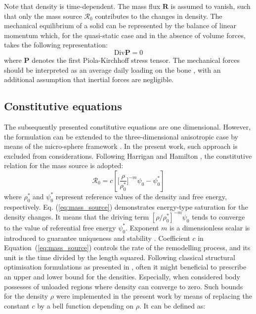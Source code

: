 \documentclass[11pt]{ACMEarticle}
\numberwithin{equation}{section}
\begin{document}
Note that density is time-dependent. The mass flux $\mathbf{R}$ is assumed to vanish, such that only the mass source $\mathcal{R}_0$ contributes to the changes in density. 
The mechanical equilibrium of a solid can be represented by the balance of linear momentum which, for the quasi-static case and in the absence of volume forces, takes the following representation:
\begin{equation}
\text{Div}\mathbf{{\mathbf{P}}} = 0
\label{eq:momentum_balance}
\end{equation}
where $\mathbf{P}$ denotes the first Piola-Kirchhoff stress tensor. 
The mechanical forces should be interpreted as an average daily loading on the bone \citep{kuhl2003computational}, with an additional assumption that inertial forces are negligible. 
\subsection{Constitutive equations}
The subsequently presented constitutive equations are one dimensional. However, the formulation can be extended to the three-dimensional anisotropic case by means of the micro-sphere framework \citep{Waffenschmidt2012}. In the present work, such approach is excluded from considerations.
Following Harrigan and Hamilton \citep{Harrigan1993}, the constitutive relation for the mass source is adopted:
\begin{equation}
\mathcal{R}_{0}=c\left[\Biggl[\frac{\rho}{\rho_{0}^{\ast}}\Biggr]^{-m}\psi_{0}-\psi_{0}^{\ast}\right]
\label{eq:mass_source}
\end{equation}
where $\rho_0^\ast$ and $\psi_{0}^\ast$ represent reference values of the density and free energy, respectively.  Eq. (\ref{eq:mass_source}) demonstrates energy-type saturation for the density changes. It means that the driving term $\left[ \rho / \rho_0^\ast \right]^{-m}\psi_0$ tends to converge to the value of referential free energy $\psi_{0}^\ast$. 
Exponent $m$ is a dimensionless scalar is introduced to guarantee uniqueness and stability \citep{Harrigan1993} . 
Coefficient $c$ in Equation~(\ref{eq:mass_source}) controls the rate of the remodelling process, and its unit is the time divided by the length squared. Following classical structural optimisation formulations as presented in \citep{Waffenschmidt2012}, often it might beneficial to prescribe an upper and lower bound for the densities. Especially, when considered body possesses of unloaded regions where density can converge to zero. Such bounds for the density $\rho$ were implemented in the present work by means of replacing the constant $c$ by a bell function depending on $\rho$. It can be defined as:
\end{document}
